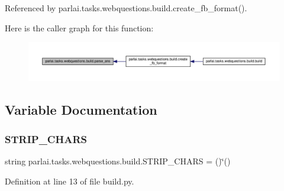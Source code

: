 Referenced by parlai.\+tasks.\+webquestions.\+build.\+create\+\_\+fb\+\_\+format().

Here is the caller graph for this function\+:
\nopagebreak
\begin{figure}[H]
\begin{center}
\leavevmode
\includegraphics[width=350pt]{namespaceparlai_1_1tasks_1_1webquestions_1_1build_a969c68eeef096e477def172c88928eb3_icgraph}
\end{center}
\end{figure}


\subsection{Variable Documentation}
\mbox{\label{namespaceparlai_1_1tasks_1_1webquestions_1_1build_a199339b3ddbfe999e55a41d81af81def}} 
\subsubsection{\texorpdfstring{S\+T\+R\+I\+P\+\_\+\+C\+H\+A\+RS}{STRIP\_CHARS}}
{\footnotesize\ttfamily string parlai.\+tasks.\+webquestions.\+build.\+S\+T\+R\+I\+P\+\_\+\+C\+H\+A\+RS = \textquotesingle{} ()\char`\"{}()\textquotesingle{}}



Definition at line 13 of file build.\+py.

